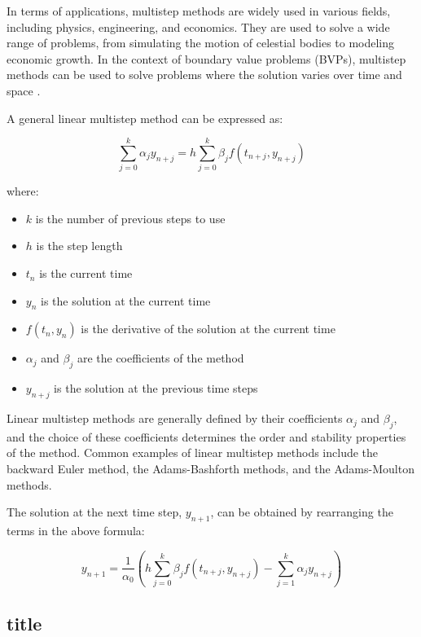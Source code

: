 In terms of applications, multistep methods are widely used in various fields, including physics, engineering, and economics. They are used to solve a wide range of problems, from simulating the motion of celestial bodies to modeling economic growth. In the context of boundary value problems (BVPs), multistep methods can be used to solve problems where the solution varies over time and space \cite{math7121158}.

A general linear multistep method can be expressed as:

\[
\sum_{j=0}^{k} \alpha_j y_{n+j} = h \sum_{j=0}^{k} \beta_j f(t_{n+j}, y_{n+j})
\]

where:


\begin{itemize}
  \item \(k\) is the number of previous steps to use
  \item \(h\) is the step length
  \item \(t_n\) is the current time
  \item \(y_n\) is the solution at the current time
  \item \(f(t_n, y_n)\) is the derivative of the solution at the current time
  \item \(\alpha_j\) and \(\beta_j\) are the coefficients of the method
  \item \(y_{n+j}\) is the solution at the previous time steps
\end{itemize}


Linear multistep methods are generally defined by their coefficients \(\alpha_j\) and \(\beta_j\), and the choice of these coefficients determines the order and stability properties of the method. Common examples of linear multistep methods include the backward Euler method, the Adams-Bashforth methods, and the Adams-Moulton methods.

The solution at the next time step, \(y_{n+1}\), can be obtained by rearranging the terms in the above formula:

\[
y_{n+1} = \frac{1}{\alpha_0} \left(h \sum_{j=0}^{k} \beta_j f(t_{n+j}, y_{n+j}) - \sum_{j=1}^{k} \alpha_j y_{n+j}\right)
\]

\subsection*{title}

